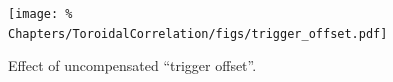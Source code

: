 % 

\begin{figure}
  \centering
  \texttt{[image: \%
    Chapters/ToroidalCorrelation/figs/trigger\_offset.pdf]}
  \caption[Effect of uncompensated ``trigger offset'']{%
    Effect of uncompensated ``trigger offset''.
  }
\label{fig:ToroidalCorrelation:trigger_offset}
\end{figure}

